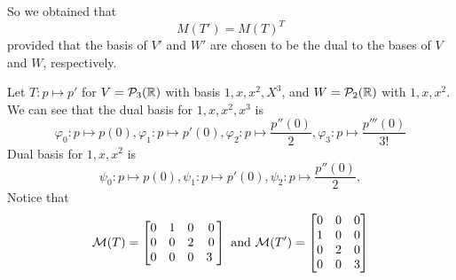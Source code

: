 \begin{conjecture}
    So we obtained that 
    \[ M(T') = M(T)^{T}\]
    provided that the basis of $V'$ and $W'$ are chosen to be the dual to the bases of $V$ and $W$, respectively.
\end{conjecture}
\begin{example}
    Let $T: p \mapsto p'$ for $V = \mathcal P_3(\mathbb R)$ with basis $1,x,x^2, X^3$, and $W = \mathcal P_2(\mathbb R)$ with $1,x,x^2$. \\
    We can see that the dual basis for $1,x,x^2, x^3$ is \[\varphi_0 : p \mapsto p(0), \varphi_1 : p \mapsto p'(0), \varphi_2: p \mapsto \frac{p''(0)}{2}, \varphi_3 : p \mapsto \frac{p'''(0)}{3!}\]
    Dual basis for $1,x,x^2$ is 
    \[\psi_0 : p \mapsto p(0), \psi_1 : p \mapsto p'(0), \psi_2: p \mapsto \frac{p''(0)}{2}, 
    \]
    Notice that \[\c M(T) = \bml 0 & 1 & 0 & 0 \\ 0 & 0 & 2 & 0 \\ 0 & 0 & 0 & 3\ \bmr \text{ and } \c M(T') = \bml 0 & 0 & 0 \\ 1 & 0 & 0 \\ 0 & 2 & 0 \\ 0 & 0 & 3 \bmr\]
\end{example}